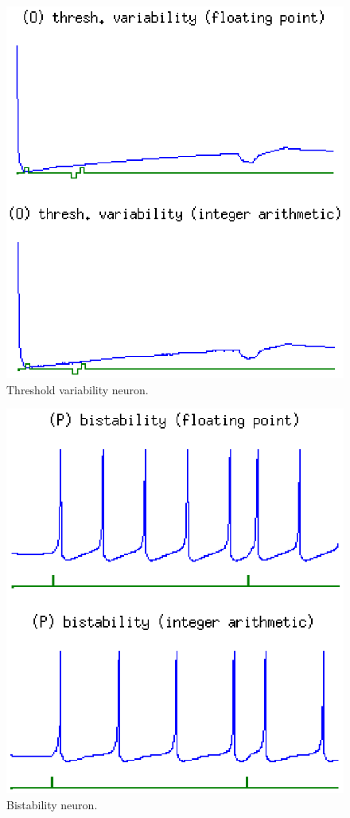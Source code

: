\documentclass[journal]{./sty/IEEEtran}
\begin{document}
\begin{figure}
\centering
\includegraphics[scale=0.6]{imgs/izh_thresh_variability}
\caption{Threshold variability neuron.\label{fig:threshvar}}
\end{figure}

\begin{figure}
\centering
\includegraphics[scale=0.6]{imgs/izh_bistability}
\caption{Bistability neuron.\label{fig:bistable}}
\end{figure}
\end{document}
